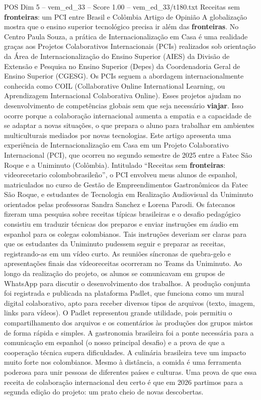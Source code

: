 \begin{textsample}{POS Dim 5 – vem\_ed\_33 – Score 1.00 – vem\_ed\_33/t180.txt}  \label{ex:f5_pos_103}
Receitas sem \textbf{fronteiras}: um PCI entre Brasil e Colômbia Artigo de Opinião A globalização mostra que o ensino superior tecnológico precisa ir além das \textbf{fronteiras}.
No Centro Paula Souza, a prática de Internacionalização em Casa é uma realidade graças aos Projetos Colaborativos Internacionais (PCIs) realizados sob orientação da Área de Internacionalização do Ensino Superior (AIES) da Divisão de Extensão e Pesquisa no Ensino Superior (Depes) da Coordenadoria Geral de Ensino Superior (CGESG).
Os PCIs seguem a abordagem internacionalmente conhecida como COIL (Collaborative Online International Learning, ou Aprendizagem Internacional Colaborativa Online).
Esses projetos ajudam no desenvolvimento de competências globais sem que seja necessário \textbf{viajar}.
Isso ocorre porque a colaboração internacional aumenta a empatia e a capacidade de se adaptar a novas situações, o que prepara o aluno para trabalhar em ambientes multiculturais mediados por novas tecnologias.
Este artigo apresenta uma experiência de Internacionalização em Casa em um Projeto Colaborativo Internacional (PCI), que ocorreu no segundo semestre de 2025 entre a Fatec São Roque e a Uniminuto (Colômbia).
Intitulado “Receitas sem \textbf{fronteiras}: videorecetario colombobrasileño”, o PCI envolveu meus alunos de espanhol, matriculados no curso de Gestão de Empreendimentos Gastronômicos da Fatec São Roque, e estudantes de Tecnologia em Realização Audiovisual da Uniminuto orientados pelas professoras Sandra Sanchez e Lorena Parodi.
Os fatecanos fizeram uma pesquisa sobre receitas típicas brasileiras e o desafio pedagógico consistiu em traduzir técnicas dos preparos e enviar instruções em áudio em espanhol para os colegas colombianos.
Tais instruções deveriam ser claras para que os estudantes da Uniminuto pudessem seguir e preparar as receitas, registrando-as em um vídeo curto.
As reuniões síncronas de quebra-gelo e apresentações finais das vídeoreceitas ocorreram no Teams da Uniminuto.
Ao longo da realização do projeto, os alunos se comunicavam em grupos de WhatsApp para discutir o desenvolvimento dos trabalhos.
A produção conjunta foi registrada e publicada na plataforma Padlet, que funciona como um mural digital colaborativo, apto para receber diversos tipos de arquivos (texto, imagem, links para vídeos).
O Padlet representou grande utilidade, pois permitiu o compartilhamento dos arquivos e os comentários às produções dos grupos mistos de forma rápida e simples.
A gastronomia brasileira foi a ponte necessária para a comunicação em espanhol (o nosso principal desafio) e a prova de que a cooperação técnica supera dificuldades.
A culinária brasileira teve um impacto muito forte nos colombianos.
Mesmo à distância, a comida é uma ferramenta poderosa para unir pessoas de diferentes países e culturas.
Uma prova de que essa receita de colaboração internacional deu certo é que em 2026 partimos para a segunda edição do projeto: um prato cheio de novas descobertas.

\end{textsample}
